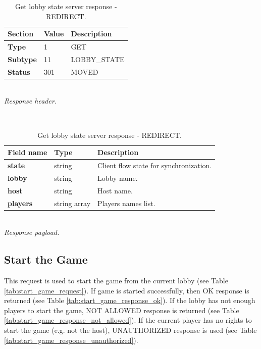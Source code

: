 \documentclass[english, sem, kiv, he, iso690alph, pdf, viewonly]{fasthesis}
\begin{document}
\begin{table}[h!]
	\centering
	\begin{minipage}[b]{1.0\textwidth}
		\centering
		\begin{tabular}{|l|l|l|}
			\hline
			\textbf{Section} & \textbf{Value} & \textbf{Description} \\ \hline
			\textbf{Type} & 1 & \footnotesize{GET} \\ \hline
			\textbf{Subtype} & 11 & \footnotesize{LOBBY\_STATE}  \\ \hline
			\textbf{Status} & 301 & \footnotesize{MOVED} \\ \hline
		\end{tabular} \\
		\textit{Response header.}
	\end{minipage} 
	\\
	\vspace{10pt}
	\begin{minipage}[b]{1.0\textwidth}
		\centering
		\begin{tabular}{|l|l|l|}
			\hline
			\textbf{Field name} & \textbf{Type} & \textbf{Description} \\ \hline
			\textbf{state} & string & Client flow state for synchronization. \\ \hline
			\textbf{lobby} & string & Lobby name. \\ \hline
			\textbf{host} & string & Host name. \\ \hline
			\textbf{players} & string array & Players names list. \\ \hline
		\end{tabular} \\
		\textit{Response payload.}
	\end{minipage}	
	\caption{Get lobby state server response - REDIRECT.}
	\label{tab:get_lobby_state_response_redirect}
\end{table}

\newpage

\subsection{Start the Game}

This request is used to start the game from the current lobby (see Table \ref{tab:start_game_request}). If game is started successfully, then OK response is returned (see Table \ref{tab:start_game_response_ok}). If the lobby has not enough players to start the game, NOT ALLOWED response is returned (see Table \ref{tab:start_game_response_not_allowed}). If the current player has no rights to start the game (e.g. not the host), UNAUTHORIZED response is used (see Table \ref{tab:start_game_response_unauthorized}).
\end{document}
